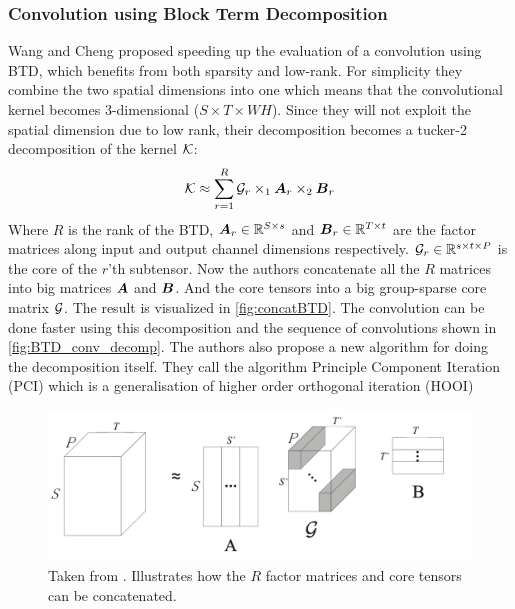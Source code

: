 \subsubsection{Convolution using Block Term Decomposition}
Wang and Cheng proposed speeding up the evaluation of a convolution using BTD, which benefits from both sparsity and low-rank. For simplicity they combine the two spatial dimensions into one which means that the convolutional kernel becomes 3-dimensional ($S\times T \times WH$). Since they will not exploit the spatial dimension due to low rank, their decomposition becomes a tucker-2 decomposition of the kernel $\mathcal{K}$:
\begin{equation}
    \mathcal{K} \approx \sum_{r=1}^{R} \mathcal{G}_r \times_1 \boldsymbol{A}_r \times_2 \boldsymbol{B}_r
\end{equation}
Where $R$ is the rank of the BTD, $\boldsymbol{A}_r \in \mathbb{R}^{S\times s}$ and $\boldsymbol{B}_r \in \mathbb{R}^{T\times t}$ are the factor matrices along input and output channel dimensions respectively. $\mathcal{G}_r \in \mathbb{R}^{s\times t \times P}$ is the core of the $r$'th subtensor. Now the authors concatenate all the $R$ matrices into big matrices $\boldsymbol{A}$ and $\boldsymbol{B}$. And the core tensors into a big group-sparse core matrix $\mathcal{G}$. The result is visualized in \autoref{fig:concatBTD}. The convolution can be done faster using this decomposition and the sequence of convolutions shown in \autoref{fig:BTD_conv_decomp}. The authors also propose a new algorithm for doing the decomposition itself. They call the algorithm Principle Component Iteration (PCI) which is a generalisation of higher order orthogonal iteration (HOOI)

\begin{figure}
    \centering
    \includegraphics[width=0.8\linewidth]{Pics/03_Previous_work/concatBTD.png}
    \captionsetup{width=.85\linewidth}
    \caption{Taken from \cite{Wang2016}. Illustrates how the $R$ factor matrices and core tensors can be concatenated.} 
    \label{fig:concatBTD}
\end{figure}

